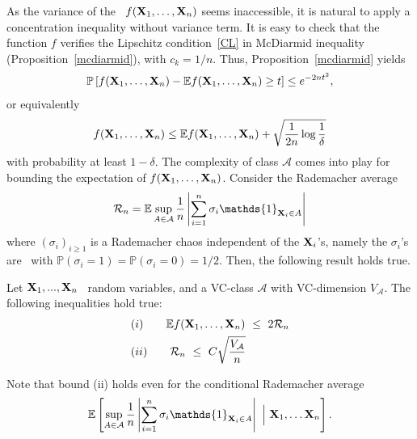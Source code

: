 As the variance of the \rv~$f(\mathbf X_1,\ldots, \mathbf X_n)$ seems inaccessible, it is natural to apply a concentration inequality without variance term. It is easy to check that the function $f$ verifies the Lipschitz condition~\ref{CL} in McDiarmid inequality (Proposition~\ref{mcdiarmid}), with $c_k = 1/n$. Thus, Proposition~\ref{mcdiarmid} yields
\begin{align*}
\mathbb{P}\left[f(\mathbf X_1,\ldots,\mathbf X_n)-\mathbb{E}f(\mathbf X_1,\ldots,\mathbf X_n) \geq t\right] \leq e^{-2nt^2},
\end{align*}
or equivalently
\begin{align}
\label{eq:mcd1}
f(\mathbf X_1,\ldots,\mathbf X_n) \le \mathbb{E}f(\mathbf X_1,\ldots,\mathbf X_n) + \sqrt{\frac{1}{2n} \log{\frac{1}{\delta}}}
\end{align}
with probability at least $1-\delta$.
The complexity of class $\mathcal{A}$ comes into play for bounding the expectation of $f(\mathbf X_1,\ldots,\mathbf X_n)$.
Consider the Rademacher average $$\mathcal{R}_n = \mathbb{E} \sup_{A \in \mathcal{A}} \frac{1}{n} \left | \sum_{i=1}^{n} \sigma_i \mathds{1}_{\mb X_i \in A}\right|$$ where $(\sigma_i)_{i \ge 1}$ is a Rademacher chaos independent of the $\mathbf X_i$'s, namely the $\sigma_i$'s are \iid~with $\mathbb{P}(\sigma_i = 1) = \mathbb{P}(\sigma_i = 0) = 1/2$.
Then, the following result holds true.
\begin{lemma}
\label{back:lem-rademacher}
Let $\mathbf X_1,...,\mathbf X_n$ \iid~random variables, and a VC-class $\mathcal{A}$ with VC-dimension $V_{\mathcal{A}}$.
The following inequalities hold true:
\begin{align*}
&(i)~~~~~~  \mathbb{E}f(\mathbf X_1,\ldots,\mathbf X_n) ~\le~ 2 \mathcal{R}_n\\
&(ii)~~~~~~ \mathcal{R}_n ~\le~ C \sqrt{\frac{V_{\mathcal{A}}}{n}}
\end{align*}
\end{lemma}
\begin{remark}
Note that bound (ii) holds even for the conditional Rademacher average $$\mathbb{E} \left[\sup_{A \in \mathcal{A}} \frac{1}{n} \left | \sum_{i=1}^{n} \sigma_i \mathds{1}_{\mb X_i \in A}\right|  ~\Big|~ \mb X_1,\ldots \mb X_n \right].$$
\end{remark}
